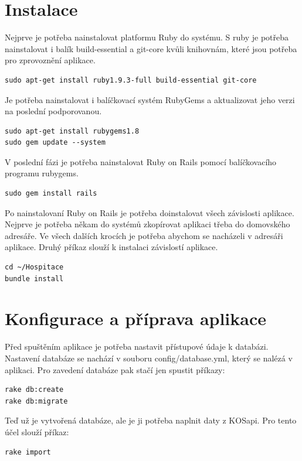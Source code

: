 \section{Instalace}
Nejprve je potřeba nainstalovat platformu Ruby do systému. S ruby je potřeba nainstalovat i balík build-essential a git-core kvůli  knihovnám, které jsou potřeba pro zprovoznění aplikace. 

\begin{verbatim}
sudo apt-get install ruby1.9.3-full build-essential git-core
\end{verbatim}

Je potřeba nainstalovat i balíčkovací systém RubyGems a aktualizovat jeho verzi na poslední podporovanou.
\begin{verbatim}
sudo apt-get install rubygems1.8
sudo gem update --system
\end{verbatim}

V poslední fázi je potřeba nainstalovat Ruby on Rails pomocí balíčkovacího programu rubygems.

\begin{verbatim}
sudo gem install rails
\end{verbatim}

Po nainstalovaní Ruby on Rails je potřeba doinstalovat všech závislosti aplikace. Nejprve je potřeba někam do systémů zkopírovat aplikaci třeba do domovského adresáře. Ve všech dalších krocích je potřeba abychom se nacházeli v adresáři aplikace. Druhý příkaz slouží k instalaci závislostí aplikace.

\begin{verbatim}
cd ~/Hospitace
bundle install
\end{verbatim}  

\section{Konfigurace a příprava aplikace}
Před spuštěním aplikace je potřeba nastavit přístupové údaje k databázi. Nastavení databáze se nachází v souboru config/database.yml, který se nalézá v aplikaci. Pro zavedení databáze pak stačí jen spustit příkazy:

\begin{verbatim}
rake db:create
rake db:migrate
\end{verbatim}  

Teď už je vytvořená databáze, ale je ji potřeba naplnit daty z KOSapi. Pro tento účel slouží příkaz:

\begin{verbatim}
rake import
\end{verbatim}

